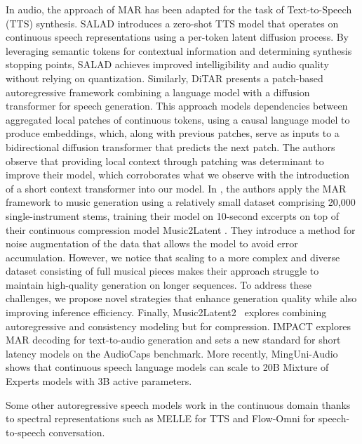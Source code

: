 In audio, the approach of MAR has been adapted for the task of Text-to-Speech (TTS) synthesis. SALAD \citep{salad} introduces a zero-shot TTS model that operates on continuous speech representations using a per-token latent diffusion process. By leveraging semantic tokens for contextual information and determining synthesis stopping points, SALAD achieves improved intelligibility and audio quality without relying on quantization. Similarly, DiTAR \citep{ditar} presents a patch-based autoregressive framework combining a language model with a diffusion transformer for speech generation. This approach models dependencies between aggregated local patches of continuous tokens, using a causal language model to produce embeddings, which, along with previous patches, serve as inputs to a bidirectional diffusion transformer that predicts the next patch. The authors observe that providing local context through patching was determinant to improve their model, which corroborates what we observe with the introduction of a short context transformer into our model. 
In \citet{sony_trick}, the authors apply the MAR framework to music generation using a relatively small dataset comprising 20,000 single-instrument stems, training their model on 10-second excerpts on top of their continuous compression model Music2Latent \citep{music2latent}. They introduce a method for noise augmentation of the data that allows the model to avoid error accumulation. However, we notice that scaling to a more complex and diverse dataset consisting of full musical pieces makes their approach struggle to maintain high-quality generation on longer sequences. To address these challenges, we propose novel strategies that enhance generation quality while also improving inference efficiency. Finally, Music2Latent2~\citep{music2latent2} explores combining autoregressive and consistency modeling but for compression. IMPACT \citep{impact} explores MAR decoding for text-to-audio generation and sets a new standard for short latency models on the AudioCaps \citep{audiocaps} benchmark. More recently, MingUni-Audio \citep{ming_uni_audio} shows that continuous speech language models can scale to 20B Mixture of Experts models with 3B active parameters.

Some other autoregressive speech models work in the continuous domain thanks to spectral representations such as MELLE \citep{melle} for TTS and Flow-Omni \citep{flow_omni} for speech-to-speech conversation. 


